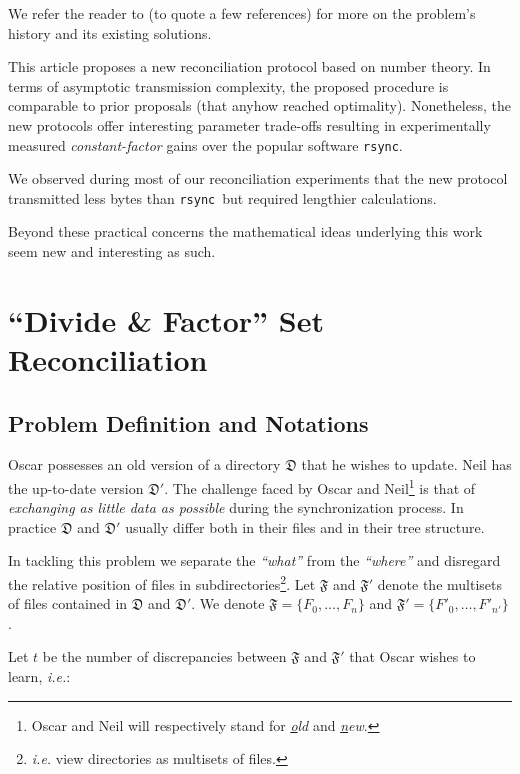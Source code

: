 \documentclass[11pt]{llncs}
\newcommand{\rsync}{\texttt{rsync}\xspace}
\begin{document}
We refer the reader to \cite{PSRec,Mins1,Whats} (to quote a few references) for more on the problem's history and its existing solutions.\smallskip

This article proposes a new reconciliation protocol based on number theory. In terms of asymptotic  transmission complexity, the proposed procedure is comparable to prior proposals (that anyhow reached optimality). Nonetheless, the new protocols offer interesting parameter trade-offs resulting in experimentally measured {\sl constant-factor} gains over the popular software \rsync.\smallskip

We observed during most of our reconciliation experiments that the new protocol transmitted less bytes than \rsync\ but required lengthier calculations.\smallskip

Beyond these practical concerns the mathematical ideas underlying this work seem new and interesting as such.

\section{``Divide \& Factor'' Set Reconciliation}

\subsection{Problem Definition and Notations}

Oscar possesses an old version of a directory $\mathfrak{D}$ that he wishes to update. Neil has the up-to-date version $\mathfrak{D}'$. The challenge faced by Oscar and Neil\footnote{Oscar and Neil will respectively stand for {\sl \underline{o}ld} and {\sl \underline{n}ew}.} is that of {\sl exchanging as little data as possible} during the synchronization process. In practice $\mathfrak{D}$ and $\mathfrak{D}'$ usually differ both in their files and in their tree structure.\smallskip

In tackling this problem we separate the {\sl ``what''} from the {\sl ``where''} and disregard the relative position of files in subdirectories\footnote{{\sl i.e.} view directories as multisets of files.}. Let $\mathfrak{F}$ and $\mathfrak{F}'$ denote the multisets of files contained in $\mathfrak{D}$ and $\mathfrak{D}'$. We denote $\mathfrak{F}=\{F_0,\ldots,F_{n}\}$ and $\mathfrak{F}'=\{F'_0,\ldots,F'_{n'}\}$.\smallskip

Let $t$ be the number of discrepancies between $\mathfrak{F}$ and $\mathfrak{F}'$ that Oscar wishes to learn, {\sl i.e.}:
\end{document}
